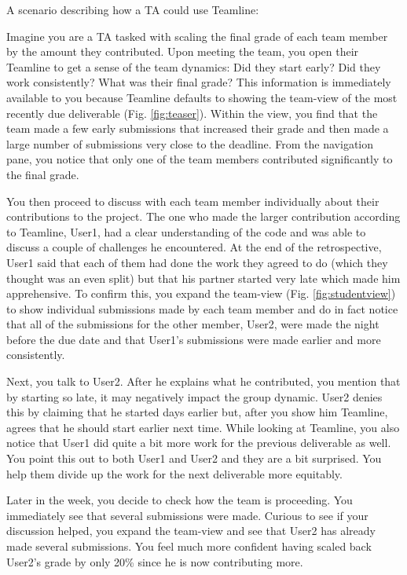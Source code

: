 \documentclass[../manifest.tex]{subfiles}
\begin{document}
A scenario describing how a TA could use Teamline:

Imagine you are a TA tasked with scaling the final grade of each team member by
the amount they contributed. Upon meeting the team, you open their Teamline to
get a sense of the team dynamics: Did they start early? Did they work consistently?
What was their final grade? This information is immediately available to you
because Teamline defaults to showing the team-view of the most recently due deliverable (Fig. \ref{fig:teaser}).
Within the view, you find that the team made a few early submissions that
increased their grade and then made a large number of submissions very close to
the deadline. From the navigation pane, you notice that only one of the team members
contributed significantly to the final grade.

You then proceed to discuss with each team member individually about their contributions
to the project. The one who made the larger contribution according to Teamline, User1,
had a clear understanding of the code and was able to discuss a couple of challenges
he encountered. At the end of the retrospective, User1 said that each of them had
done the work they agreed to do (which they thought was an even split) but that
his partner started very late which made him apprehensive.
To confirm this, you expand the team-view (Fig. \ref{fig:studentview}) to show individual submissions made by
each team member and do in fact notice that all of the submissions for the other
member, User2, were made the night before the due date and that User1's submissions were
made earlier and more consistently.

Next, you talk to User2. After he explains what he contributed, you mention that by
starting so late, it may negatively impact the group dynamic. User2 denies this by claiming
that he started days earlier but, after you show him Teamline, agrees that he should
start earlier next time. While looking at Teamline, you also notice that User1 did
quite a bit more work for the previous deliverable as well. You point this out to
both User1 and User2 and they are a bit surprised. You help them divide up the work
for the next deliverable more equitably.

Later in the week, you decide to check how the team is proceeding. You immediately
see that several submissions were made. Curious to see if your discussion helped,
you expand the team-view and see that User2 has already made several submissions.
You feel much more confident having scaled back User2's grade by only 20\% since he
is now contributing more.
\end{document}

